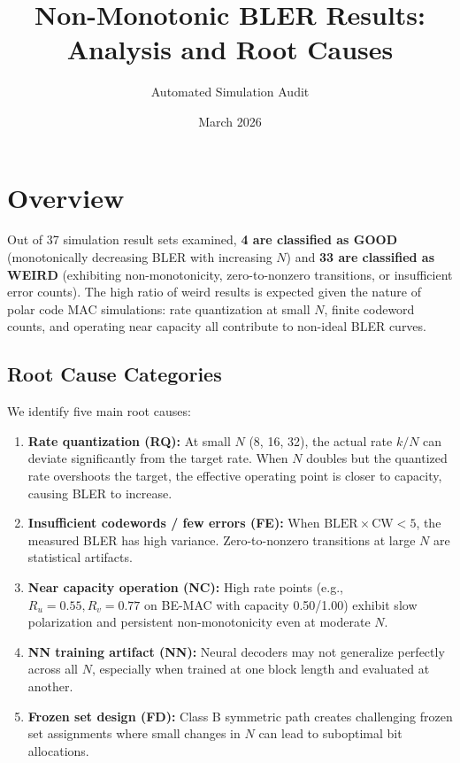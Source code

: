 \documentclass[11pt,a4paper]{article}
\title{Non-Monotonic BLER Results:\\Analysis and Root Causes}
\author{Automated Simulation Audit}
\date{March 2026}
\begin{document}
\maketitle

\section{Overview}

Out of 37 simulation result sets examined, \textbf{4 are classified as GOOD}
(monotonically decreasing BLER with increasing $N$) and \textbf{33 are classified
as WEIRD} (exhibiting non-monotonicity, zero-to-nonzero transitions, or
insufficient error counts). The high ratio of weird results is expected given
the nature of polar code MAC simulations: rate quantization at small $N$,
finite codeword counts, and operating near capacity all contribute to
non-ideal BLER curves.

\subsection{Root Cause Categories}

We identify five main root causes:

\begin{enumerate}
\item \textbf{Rate quantization (RQ):} At small $N$ (8, 16, 32), the actual rate $k/N$ can deviate significantly from the target rate. When $N$ doubles but the quantized rate overshoots the target, the effective operating point is closer to capacity, causing BLER to increase.

\item \textbf{Insufficient codewords / few errors (FE):} When $\text{BLER} \times \text{CW} < 5$, the measured BLER has high variance. Zero-to-nonzero transitions at large $N$ are statistical artifacts.

\item \textbf{Near capacity operation (NC):} High rate points (e.g., $R_u=0.55, R_v=0.77$ on BE-MAC with capacity 0.50/1.00) exhibit slow polarization and persistent non-monotonicity even at moderate $N$.

\item \textbf{NN training artifact (NN):} Neural decoders may not generalize perfectly across all $N$, especially when trained at one block length and evaluated at another.

\item \textbf{Frozen set design (FD):} Class B symmetric path creates challenging frozen set assignments where small changes in $N$ can lead to suboptimal bit allocations.
\end{enumerate}
\end{document}
